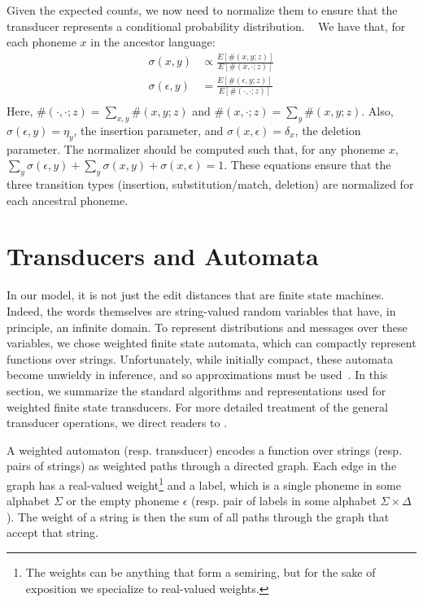 \documentclass[11pt,a4paper]{article}
\begin{document}
Given the expected counts, we now need to normalize them to ensure
that the transducer represents a conditional probability distribution.
~\cite{eisner2002parameter,Oncina20061575} We have that, for each
phoneme $x$ in the ancestor language:
\begin{equation*}
  \begin{split}
    \sigma(x,y) &\propto \frac{E[\#(x,y;z)]}{E[\#(x,\cdot;z)]} \\
    \sigma(\epsilon,y) &= \frac{E[\#(\epsilon,y;z)]}{E[\#(\cdot,\cdot;z)]} \\
   \end{split}
 \end{equation*}
Here, $\#(\cdot,\cdot;z) = \sum_{x,y} \#(x,y;z)$ and $\#(x,\cdot;z)=\sum_y
\#(x,y;z)$. Also, $\sigma(\epsilon,y) = \eta_y$, the insertion
parameter, and $\sigma(x,\epsilon) = \delta_x$, the deletion
parameter. The normalizer should be computed such that, for any
phoneme $x$, $\sum_y \sigma(\epsilon,y) + \sum_y \sigma(x,y) +
\sigma(x,\epsilon) = 1$.  These equations ensure that the three
transition types (insertion, substitution/match, deletion) are
normalized for each ancestral phoneme. 

\section{Transducers and Automata}

In our model, it is not just the edit distances that are finite
state machines. Indeed, the words themselves are string-valued
random variables that have, in principle, an infinite domain. To
represent distributions and messages over these variables, we chose
weighted finite state automata, which can compactly represent
functions over strings. Unfortunately, while initially compact,
these automata become unwieldy in inference, and so approximations
must be used~\cite{dreyer2009graphical}.  In this section, we
summarize the standard algorithms and representations used for
weighted finite state transducers. For more detailed treatment of
the general transducer operations, we direct readers to
.

A weighted automaton (resp. transducer) encodes a function over
strings (resp. pairs of strings) as weighted paths through a directed
graph. Each edge in the graph has a real-valued weight\footnote{The
weights can be anything that form a semiring, but for the sake of
exposition we specialize to real-valued weights.} and a label, which
is a single phoneme in some alphabet $\Sigma$ or the empty phoneme
$\epsilon$ (resp. pair of labels in some alphabet $\Sigma \times
\Delta$). The weight of a string is then the sum of all paths through
the graph that accept that string.
\end{document}
